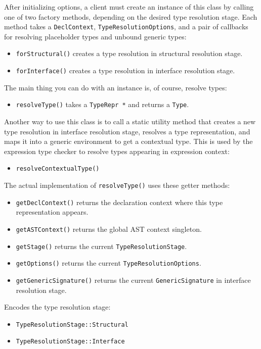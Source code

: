 \documentclass[../generics]{subfiles}
\begin{document}
After initializing options, a client must create an instance of this class by calling one of two factory methods, depending on the desired type resolution stage. Each method takes a \texttt{DeclContext}, \texttt{TypeResolutionOptions}, and a pair of callbacks for resolving placeholder types and unbound generic types:
\begin{itemize}
\item \texttt{forStructural()} creates a type resolution in structural resolution stage.
\item \texttt{forInterface()} creates a type resolution in interface resolution stage.
\end{itemize}
The main thing you can do with an instance is, of course, resolve types:
\begin{itemize}
\item \texttt{resolveType()} takes a \texttt{TypeRepr *} and returns a \texttt{Type}.
\end{itemize}

Another way to use this class is to call a static utility method that creates a new type resolution in interface resolution stage, resolves a type representation, and maps it into a generic environment to get a contextual type. This is used by the expression type checker to resolve types appearing in expression context:
\begin{itemize}
\item \texttt{resolveContextualType()}
\end{itemize}
The actual implementation of \texttt{resolveType()} uses these getter methods:
\begin{itemize}
\item \texttt{getDeclContext()} returns the declaration context where this type representation appears.
\item \texttt{getASTContext()} returns the global AST context singleton.
\item \texttt{getStage()} returns the current \texttt{TypeResolutionStage}.
\item \texttt{getOptions()} returns the current \texttt{TypeResolutionOptions}.
\item \texttt{getGenericSignature()} returns the current \texttt{GenericSignature} in interface resolution stage.
\end{itemize}

Encodes the type resolution stage:
\begin{itemize}
\item \texttt{TypeResolutionStage::Structural}
\item \texttt{TypeResolutionStage::Interface}
\end{itemize}
\end{document}
